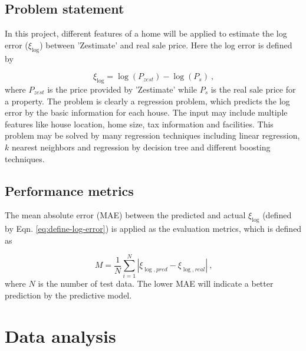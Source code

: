 \documentclass[12pt]{article}
\begin{document}
\subsection{Problem statement}
In this project, different features of a home will be applied to estimate the log error ($\xi_{\log}$) between 'Zestimate' and real sale price. Here the log error is defined by

\begin{equation}
\xi_{\log}=\log(P_{zest})-\log(P_s)~\text{,}
\label{eq:define-log-error}
\end{equation}
where $P_{zest}$ is the price provided by 'Zestimate' while $P_s$ is the real sale price for a property. The problem is clearly a regression problem, which predicts the log error by the basic information for each house. The input may include multiple features like house location, home size, tax information and facilities. This problem may be solved by many regression techniques including linear regression, $k$ nearest neighbors and regression by decision tree and different boosting techniques.

\subsection{Performance metrics}
The mean absolute error (MAE) between the predicted and actual $\xi_{\log}$ (defined by Eqn. \ref{eq:define-log-error}) is applied as the evaluation metrics, which is defined as 

\begin{equation}
M=\frac{1}{N}\sum_{i=1}^{N}\left|\xi_{\log,pred}-\xi_{\log,real}\right|~\text{,}
\label{eq:define-evaluation-metric}
\end{equation}
where $N$ is the number of test data. The lower MAE will indicate a better prediction by the predictive model.

\section{Data analysis}\label{sec:analysis}
\end{document}
